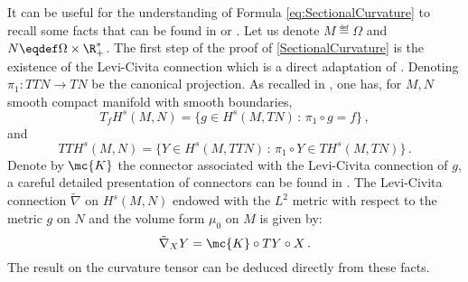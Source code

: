 \begin{remark}
It can be useful for the understanding of Formula \eqref{eq:SectionalCurvature} to recall some facts that can be found in \cite{em70} or \cite{MisiolekCurvature}.
Let us denote $M\eqdef \Omega$ and $N \eqdef \Omega \times \R_+^*$. 
The first step of the proof of \ref{SectionalCurvature} is the existence of the Levi-Civita connection which is a direct adaptation of \cite[Section 9]{em70}. Denoting $\pi_1: TTN \to TN$ be the canonical projection.  As recalled in \cite[Section 2]{em70}, one has, for $M,N$ smooth compact manifold with smooth boundaries,
\begin{equation*}
T_fH^s(M,N) = \{  g \in H^s(M,TN) \, : \, \pi_1 \circ g = f\}\,,
\end{equation*}
and
\begin{equation*}
TTH^s(M,N) = \{  Y \in H^s(M,TTN) \, : \, \pi_1 \circ Y \in TH^s(M,TN)\}\,.
\end{equation*}
Denote by $\mc{K}$ the connector associated with the Levi-Civita connection of $g$, a careful detailed presentation of connectors can be found in \cite{ArthurBesse2}.
The Levi-Civita connection $\tilde \nabla$ on $H^s(M, N)$ endowed with the $L^2$ metric with respect to the metric $g$ on $N$ and the volume form $\mu_0$ on $M$ is given by:
\begin{equation}
\tilde \nabla_X Y = \mc{K} \circ TY \circ X\,.
\end{equation}
The result on the curvature tensor can be deduced directly from these facts. 
\end{remark}
%
%



